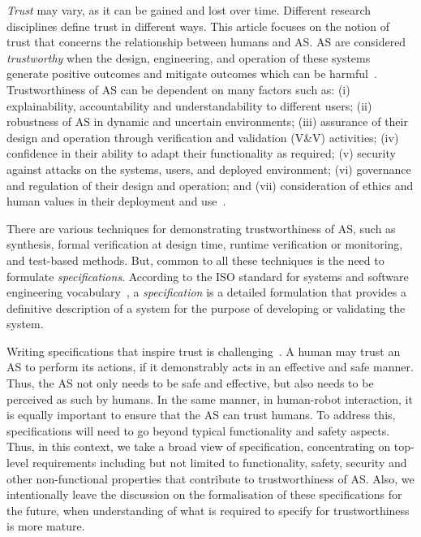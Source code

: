 \documentclass[sigconf,nonacm]{acmart}%
\begin{document}
	\emph{Trust} may vary, as it can be gained and lost over time. Different research disciplines define trust in different ways. This article focuses on the notion of trust that concerns the relationship between humans and AS. 
	AS are considered \emph{trustworthy} when the design, engineering, and operation of these systems generate positive outcomes and mitigate outcomes which can be harmful~\cite{Naiseh2022}.
	Trustworthiness of AS can be dependent on many factors such as: (i) explainability, accountability and understandability to different users; (ii) robustness of AS in dynamic and uncertain environments; (iii) assurance of their design and operation through verification and validation (V\&V) activities; (iv) confidence in their ability to adapt their functionality as required; (v) security against attacks on the systems, users, and deployed environment; (vi) governance and regulation of their design and operation; and (vii) consideration of ethics and human values in their deployment and use~\cite{Naiseh2022}. 
	
	There are various techniques for demonstrating trustworthiness of AS, such as synthesis, formal verification at design time, runtime verification or monitoring, and test-based methods. 
	But, common to all these techniques is the need to formulate \emph{specifications}. 	
	According to the ISO standard for systems and software engineering vocabulary~\cite{ISO24765:2017}, a \emph{specification} is a detailed formulation that provides a definitive description of a system for the purpose of developing or validating the system. 
	
	Writing specifications that inspire trust is challenging~\cite{Kress-Gazit2021}. 
	A human may trust an AS to perform its actions, if it demonstrably acts in an effective and safe manner. 
	Thus, the AS not only needs to be safe and effective, but also needs to be perceived as such by humans. 
	In the same manner, in human-robot interaction, it is equally important to ensure that the AS can trust humans. 
	To address this, specifications will need to go beyond typical functionality and safety aspects. Thus, in this context, we take a broad view of specification, concentrating on top-level requirements including but not limited to functionality, safety, security and other non-functional properties that contribute to trustworthiness of AS. 
	Also, we intentionally leave the discussion on the formalisation of these specifications for the future, when understanding of what is required to specify for trustworthiness is more mature.
	
\end{document}

